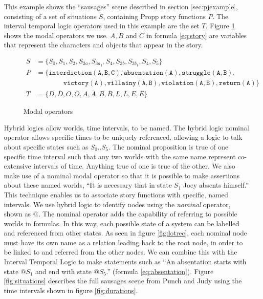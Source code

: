 \documentclass{llncs}
\begin{document}
This example shows the ``sausages'' scene described in section \ref{sec:pjexample}, consisting of a set of situations $S$, containing Propp story functions $P$. The interval temporal logic operators used in this example are the set $T$. Figure \ref{fig:operators} shows the modal operators we use. $A, B$ and $C$ in formula \ref{eq:story} are variables that represent the characters and objects that appear in the story.
\begin{figure}
\begin{align}
    S &= \{S_0, S_1, S_2, S_{3a}, S_{3a_1}, S_4, S_{3b}, S_{3b_1}, S_4, S_5\}\\
    P &= \{\mathtt{interdiction(A, B, C), absentation(A), struggle(A, B),}\nonumber\\
  &\qquad\qquad\mathtt{victory(A), villainy(A, B), violation(A, B), return(A)}\}\label{eq:story}\\
  T &= \{D, \overline{D}, O, \overline{O}, A, \overline{A}, B, \overline{B}, L, \overline{L}, E, \overline{E}\}
\end{align}
\caption{Modal operators}\label{fig:operators}
\end{figure}
Hybrid logics allow worlds, time intervals, to be named. The hybrid logic nominal operator allows specific times to be uniquely referenced, allowing a logic to talk about specific states such as $S_0..S_5$. The nominal proposition is true of one specific time interval such that any two worlds with the same name represent co-extensive intervals of time. Anything true of one is true of the other.
We also make use of a nominal modal operator so that it is possible to make assertions about these named worlds, ``It is necessary that in state $S_1$ Joey absents himself.'' This technique enables us to associate story functions with specific, named intervals.
We use hybrid logic to identify nodes using the \emph{nominal} operator, shown as $@$. The nominal operator adds the capability of referring to possible worlds in formulas. In this way, each possible state of a system can be labelled and referenced from other states. As seen in figure \ref{fig:lotrec}, each nominal node must have its own name as a relation leading back to the root node, in order to be linked to and referred from the other nodes.
We can combine this with the Interval Temporal Logic to make statements such as ``An absentation starts with state $@S_1$ and end with state $@S_5$.'' (formula \ref{eq:absentation}).
Figure \ref{fig:situations} describes the full sausages scene from Punch and Judy using the time intervals shown in figure \ref{fig:durations}.
\end{document}
